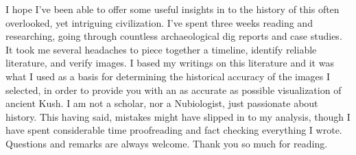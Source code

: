 \documentclass[a4paper,12pt]{scrreprt}
\begin{document}
I hope I’ve been able to offer some useful insights in to the history of this often overlooked, yet intriguing civilization. I’ve spent three weeks reading and researching, going through countless archaeological dig reports and case studies. It took me several headaches to piece together a timeline, identify reliable literature, and verify images. I based my writings on this literature and it was what I used as a basis for determining the historical accuracy of the images I selected, in order to provide you with an as accurate as possible visualization of ancient Kush. I am not a scholar, nor a Nubiologist, just passionate about history. This having said, mistakes might have slipped in to my analysis, though I have spent considerable time proofreading and fact checking everything I wrote. Questions and remarks are always welcome. Thank you so much for reading.\\

\listoffigures
\end{document}
